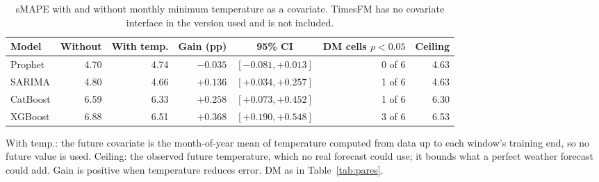 \begin{table}[htbp]
\centering
\small
\setlength{\tabcolsep}{4pt}
\caption{sMAPE with and without monthly minimum temperature as a covariate. TimesFM has no covariate interface in the version used and is not included.}
\label{tab:temperatura}
\begin{tabular}{lrrrcrr}
\toprule
Model & Without & With temp. & Gain (pp) & 95\% CI & DM cells $p<0.05$ & Ceiling \\
\midrule
Prophet & 4.70 & 4.74 & $-0.035$ & $[-0.081, +0.013]$ & 0 of 6 & 4.63 \\
SARIMA & 4.80 & 4.66 & $+0.136$ & $[+0.034, +0.257]$ & 1 of 6 & 4.63 \\
CatBoost & 6.59 & 6.33 & $+0.258$ & $[+0.073, +0.452]$ & 1 of 6 & 6.30 \\
XGBoost & 6.88 & 6.51 & $+0.368$ & $[+0.190, +0.548]$ & 3 of 6 & 6.53 \\
\bottomrule
\end{tabular}

\vspace{0.5em}
\begin{minipage}{\textwidth}
\footnotesize
With temp.: the future covariate is the month-of-year mean of temperature computed from data up to each window's training end, so no future value is used. Ceiling: the observed future temperature, which no real forecast could use; it bounds what a perfect weather forecast could add. Gain is positive when temperature reduces error. DM as in Table~\ref{tab:pares}.
\end{minipage}
\end{table}
